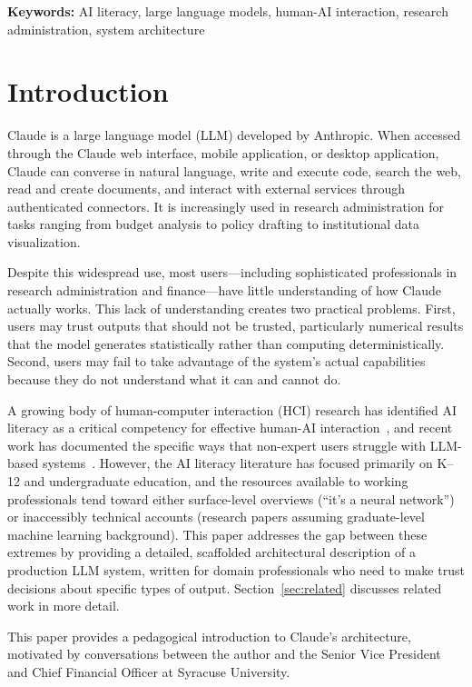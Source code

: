 \documentclass[12pt]{article}
\begin{document}
\noindent\textbf{Keywords:} AI literacy, large language models, human-AI interaction, research administration, system architecture

\section{Introduction}
\label{sec:intro}

Claude is a large language model (LLM) developed by Anthropic. When accessed through the Claude web interface, mobile application, or desktop application, Claude can converse in natural language, write and execute code, search the web, read and create documents, and interact with external services through authenticated connectors. It is increasingly used in research administration for tasks ranging from budget analysis to policy drafting to institutional data visualization.

Despite this widespread use, most users---including sophisticated professionals in research administration and finance---have little understanding of how Claude actually works. This lack of understanding creates two practical problems. First, users may trust outputs that should not be trusted, particularly numerical results that the model generates statistically rather than computing deterministically. Second, users may fail to take advantage of the system's actual capabilities because they do not understand what it can and cannot do.

A growing body of human-computer interaction (HCI) research has identified AI literacy as a critical competency for effective human-AI interaction~\cite{long2020ai,ng2021ai}, and recent work has documented the specific ways that non-expert users struggle with LLM-based systems~\cite{zamfirescu2023johnny,tankelevitch2024metacognitive}. However, the AI literacy literature has focused primarily on K--12 and undergraduate education, and the resources available to working professionals tend toward either surface-level overviews (``it's a neural network'') or inaccessibly technical accounts (research papers assuming graduate-level machine learning background). This paper addresses the gap between these extremes by providing a detailed, scaffolded architectural description of a production LLM system, written for domain professionals who need to make trust decisions about specific types of output. Section~\ref{sec:related} discusses related work in more detail.

This paper provides a pedagogical introduction to Claude's architecture, motivated by conversations between the author and the Senior Vice President and Chief Financial Officer at Syracuse University.
\end{document}
